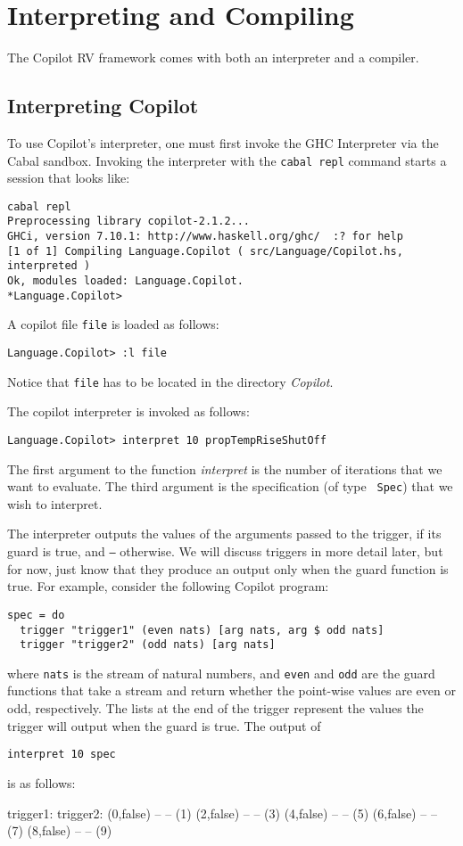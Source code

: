 \newpage 
\section{Interpreting and Compiling}
\label{interpcompile}
The Copilot RV framework comes with both an interpreter and a
compiler. 
\subsection{Interpreting Copilot}
To use Copilot's interpreter, one must first invoke the GHC Interpreter via
the Cabal sandbox. Invoking the interpreter with the \texttt{cabal
repl} command starts a session that looks like: 

%
\begin{lstlisting}[language = Copilot]
cabal repl
Preprocessing library copilot-2.1.2...
GHCi, version 7.10.1: http://www.haskell.org/ghc/  :? for help
[1 of 1] Compiling Language.Copilot ( src/Language/Copilot.hs, interpreted )
Ok, modules loaded: Language.Copilot.
*Language.Copilot> 
\end{lstlisting}
%

A copilot file \texttt{file} is loaded as follows:
%
\begin{lstlisting}[language = Copilot]
Language.Copilot> :l file
\end{lstlisting}

Notice that \texttt{file} has to be located
in the directory \emph{Copilot}.

The copilot interpreter is invoked as follows:
%
\begin{lstlisting}[language = Copilot]
Language.Copilot> interpret 10 propTempRiseShutOff
\end{lstlisting}
%
The first argument to the function \emph{interpret} is the number of iterations
that we want to evaluate. The third argument is the specification (of type {\tt
Spec}) that we wish to interpret.

The interpreter outputs the values of the arguments passed to the trigger, if
its guard is true, and {\tt --} otherwise. We will discuss triggers in more detail later, 
but for now, just know that they produce an output only when the guard function
is true. For example, consider the following
Copilot program:
%
\begin{lstlisting}[language = Copilot]
spec = do
  trigger "trigger1" (even nats) [arg nats, arg $ odd nats]
  trigger "trigger2" (odd nats) [arg nats]
\end{lstlisting}
where {\tt nats} is the stream of natural numbers, and {\tt even} and {\tt odd}
are the guard functions that take a stream and return whether the point-wise values are
even or odd, respectively. The lists at the end of the trigger represent the values the 
trigger will output when the guard is true. The output of
%
\begin{lstlisting}[language = Copilot]
interpret 10 spec
\end{lstlisting}
is as follows:
%
\begin{code}
trigger1:   trigger2:
(0,false)  --
--         (1)
(2,false)  --
--         (3)
(4,false)  --
--         (5)
(6,false)  --
--         (7)
(8,false)  --
--         (9)
\end{code}
%

